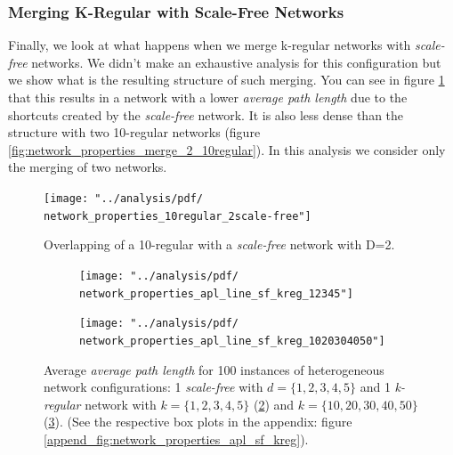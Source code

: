\documentclass[preprint,number]{elsarticle}
\begin{document}
\subsubsection{Merging K-Regular with Scale-Free Networks}
Finally, we look at what happens when we merge k-regular networks with \textit{scale-free} networks. We didn't make an exhaustive analysis for this configuration but we show what is the resulting structure of such merging. You can see in figure \ref{fig:network_properties_merge_regular_scale-free} that this results in a network with a lower \textit{average path length} due to the shortcuts created by the \textit{scale-free} network. It is also less dense than the structure with two 10-regular networks (figure \ref{fig:network_properties_merge_2_10regular}). In this analysis we consider only the merging of two networks.

\begin{figure}[H]
	\centering
	\texttt{[image: "../analysis/pdf/ network\_properties\_10regular\_2scale-free"]}
	\begin{minipage}{0.9\textwidth}
		\caption{Overlapping of a 10-regular with a \textit{scale-free} network with D=2.}
		\label{fig:network_properties_merge_regular_scale-free}
	\end{minipage}
\end{figure}

\begin{figure}[H]
	\centering
	\begin{subfigure}{.5\linewidth}
		\centering
		\texttt{[image: "../analysis/pdf/ network\_properties\_apl\_line\_sf\_kreg\_12345"]}
		\caption{}
		\label{fig:network_properties_apl_line_sf__kreg_12345}
	\end{subfigure}%
	\begin{subfigure}{.5\linewidth}
		\centering
		\texttt{[image: "../analysis/pdf/ network\_properties\_apl\_line\_sf\_kreg\_1020304050"]}
		\caption{}
		\label{fig:network_properties_apl_line_sf_kreg_1020304050}
	\end{subfigure}
	\begin{minipage}{0.9\textwidth}
		\vspace{0.2cm}
		\caption{Average \textit{average path  length} for 100 instances of heterogeneous network configurations:  1 \textit{scale-free} with $d=\{1,2,3,4,5\}$ and 1 \textit{k-regular} network with $k=\{1,2,3,4,5\}$ (\ref{fig:network_properties_apl_line_sf__kreg_12345}) and $k=\{10,20,30,40,50\}$ (\ref{fig:network_properties_apl_line_sf_kreg_1020304050}). (See the respective box plots in the appendix: figure \ref{append_fig:network_properties_apl_sf_kreg}).}
		\label{fig:network_properties_line_apl_sf_kreg}
	\end{minipage}
\end{figure}
\end{document}

